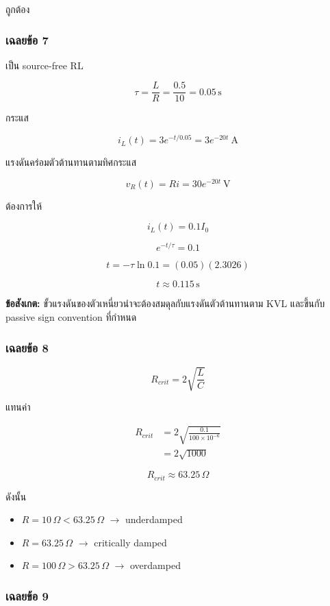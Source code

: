 ถูกต้อง

\subsubsection{เฉลยข้อ 7}

เป็น source-free RL

\[
\tau=\frac{L}{R}=\frac{0.5}{10}=0.05\,\text{s}
\]

กระแส

\[
\boxed{i_L(t)=3e^{-t/0.05}=3e^{-20t}\ \text{A}}
\]

แรงดันคร่อมตัวต้านทานตามทิศกระแส

\[
\boxed{v_R(t)=Ri=30e^{-20t}\ \text{V}}
\]

ต้องการให้

\[
i_L(t)=0.1I_0
\]

\[
e^{-t/\tau}=0.1
\]

\[
t=-\tau\ln0.1=(0.05)(2.3026)
\]

\[
\boxed{t\approx0.115\,\text{s}}
\]

\textbf{ข้อสังเกต:} ขั้วแรงดันของตัวเหนี่ยวนำจะต้องสมดุลกับแรงดันตัวต้านทานตาม KVL และขึ้นกับ passive sign convention ที่กำหนด

\subsubsection{เฉลยข้อ 8}

\[
R_{crit}=2\sqrt{\frac{L}{C}}
\]

แทนค่า

\[
\begin{aligned}
    R_{crit}&=2\sqrt{\frac{0.1}{100\times10^{-6}}} \\
    &=2\sqrt{1000}
\end{aligned}
\]

\[
\boxed{R_{crit}\approx63.25\,\Omega}
\]

ดังนั้น

\begin{itemize}
    \item $R=10\,\Omega<63.25\,\Omega$ $\to$ underdamped
    \item $R=63.25\,\Omega$ $\to$ critically damped
    \item $R=100\,\Omega>63.25\,\Omega$ $\to$ overdamped
\end{itemize}

\subsubsection{เฉลยข้อ 9}

